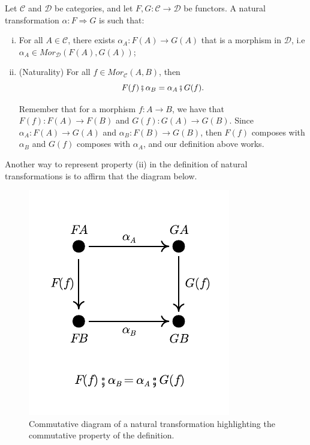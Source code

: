 \begin{definition}
  Let $\mathcal C$ and $\mathcal D$ be categories, and let $F,G:\mathcal C \to \mathcal D$ be functors.
  A natural transformation $\alpha: F \Rightarrow G$ is such that:
  \begin{enumerate}[(i)]
    \item For all $A \in \mathcal C$, there exists $\alpha_A :F(A) \to G(A)$ that is
      a morphism in $\mathcal D$, i.e $\alpha_A \in Mor_\mathcal D (F(A), G(A))$;
    \item (Naturality) For all $f \in Mor_\mathcal C (A,B)$, then
      \begin{displaymath}
        F(f)\fatsemi \alpha_B = \alpha_A \fatsemi G(f).
      \end{displaymath}

    Remember that for a morphism $f:A \to B$, we have that $F(f):F(A)\to F(B)$ and $G(f):G(A) \to G(B)$.
    Since $\alpha_A: F(A) \to G(A)$ and $\alpha_B : F(B) \to G(B)$, then $F(f)$ composes
    with $\alpha_B$ and $G(f)$ composes with $\alpha_A$, and our definition above works.
  \end{enumerate}
  \label{def:NaturalTransformation}
\end{definition}

Another way to represent property (ii) in the definition of natural transformations
is to affirm that the diagram below.

\begin{figure}[H]
  \begin{center}
    \includegraphics{./notebooks/NaturalTransformation.pdf}
  \end{center}
  \caption{Commutative diagram of a natural transformation highlighting the commutative property of the definition.}
  \label{fig:NaturalTransformation}
\end{figure}

